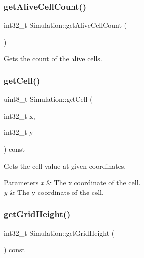 \subsubsection{\texorpdfstring{getAliveCellCount()}{getAliveCellCount()}}
{\footnotesize\ttfamily int32\+\_\+t Simulation\+::get\+Alive\+Cell\+Count (\begin{DoxyParamCaption}{ }\end{DoxyParamCaption})}



Gets the count of the alive cells. 

\mbox{\label{class_simulation_a3e8280ed7e9e198b1cd0e971f203d735}} 
\subsubsection{\texorpdfstring{getCell()}{getCell()}}
{\footnotesize\ttfamily uint8\+\_\+t Simulation\+::get\+Cell (\begin{DoxyParamCaption}\item[{int32\+\_\+t}]{x,  }\item[{int32\+\_\+t}]{y }\end{DoxyParamCaption}) const\hspace{0.3cm}{\ttfamily [inline]}}



Gets the cell value at given coordinates. 


\begin{DoxyParams}{Parameters}
{\em x} & The x coordinate of the cell.\\
\hline
{\em y} & The y coordinate of the cell.\\
\hline
\end{DoxyParams}
\mbox{\label{class_simulation_a30517d33e61a6b54515de81cdcc4039f}} 
\subsubsection{\texorpdfstring{getGridHeight()}{getGridHeight()}}
{\footnotesize\ttfamily int32\+\_\+t Simulation\+::get\+Grid\+Height (\begin{DoxyParamCaption}{ }\end{DoxyParamCaption}) const}



